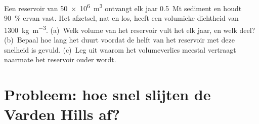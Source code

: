 \begin{exercise}[$\star\star\star$]\label{exo:b1:erosion-transport:12}
Een reservoir van \qty{50e6}{m^3} ontvangt elk jaar \qty{0.5}{Mt} sediment en houdt \qty{90}{\percent} ervan vast. Het afzetsel, nat en los, heeft een volumieke dichtheid van \qty{1300}{kg.m^{-3}}. (a)~Welk volume van het reservoir vult het elk jaar, en welk deel? (b)~Bepaal hoe lang het duurt voordat de helft van het reservoir met deze snelheid is gevuld. (c)~Leg uit waarom het volumeverlies meestal vertraagt naarmate het reservoir ouder wordt.
\end{exercise}

\section{Probleem: hoe snel slijten de Varden Hills af?}

